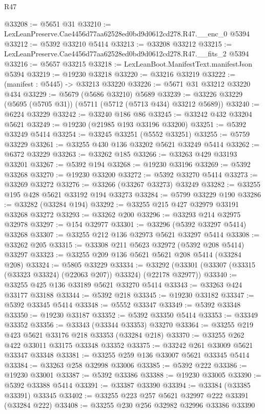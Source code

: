 \begin{lexlean}{R47}
\begin{coremodule}
@33208 := @5651 @31
@33210 := LexLeanPreserve.Cae4456d77aa62528ed0bd9d0612cd278.R47.__enc_0 @5394
@33212 := @5392 @33210 @5414
@33213 := @33208 @33212
@33215 := LexLeanPreserve.Cae4456d77aa62528ed0bd9d0612cd278.R47.__fits_2 @5394
@33216 := @5657 @33215
@33218 := LexLeanBoot.ManifestText.manifestJson @5394
@33219 := @19230 @33218
@33220 := @33216 @33219
@33222 := (manifest : @5445) -> @33213 @33220
@33226 := @5671 @31 @33212 @33220 @434
@33229 := @5679 (@5686 @33210) @5689
@33239 := @33226 @33229 (@5695 (@5705 @31)) (@5711 (@5712 (@5713 @434) @33212 @5689))
@33240 := @6224 @33229
@33242 := @33240 @186 @86
@33245 := @33242 @432 @33204 @5621
@33249 := @19230 (@21985 @193 @33196 @33200)
@33251 := @5392 @33249 @5414
@33254 := @33245 @33251 (@5552 @33251)
@33255 := @5759 @33229
@33261 := @33255 @430 @136 @33202 @5621 @33249 @5414
@33262 := @6372 @33229
@33263 := @33262 @185
@33266 := @33263 @429 @33193 @33201
@33267 := @5392 @194
@33268 := @19230 @33196
@33269 := @5392 @33268
@33270 := @19230 @33200
@33272 := @5392 @33270 @5414
@33273 := @33269 @33272
@33276 := @33266 (@33267 @33273) @33249
@33282 := @33255 @195 @428 @5621 @33192 @194 @33273
@33284 := @5799 @33229 @190
@33286 := @33282 (@33284 @194)
@33292 := @33255 @215 @427 @32979 @33191 @33268 @33272
@33293 := @33262 @200
@33296 := @33293 @214 @32975 @32978
@33297 := @154 @32977
@33301 := @33296 (@5392 @33297 @5414) @33268
@33307 := @33255 @212 @136 @32973 @5621 @33297 @5414
@33308 := @33262 @205
@33315 := @33308 @211 @5623 @32972 (@5392 @208 @5414) @33297
@33323 := @33255 @209 @136 @5621 @5621 @208 @5414 (@33284 @208)
@33324 := @5805 @33229
@33334 := @33292 (@33301 (@33307 (@33315 (@33323 @33324) (@22063 @207)) @33324) (@22178 @32977))
@33340 := @33255 @425 @136 @33189 @5621 @33270 @5414
@33343 := @33263 @424 @33177 @33188
@33344 := @5392 @218
@33345 := @19230 @33182
@33347 := @5392 @33345 @5414
@33348 := @5552 @33347
@33349 := @5392 @33348
@33350 := @19230 @33187
@33352 := @5392 @33350 @5414
@33353 := @33349 @33352
@33356 := @33343 (@33344 @33353) @33270
@33364 := @33255 @219 @423 @5621 @33176 @218 @33353 (@33284 @218)
@33370 := @33255 @262 @422 @33011 @33175 @33348 @33352
@33375 := @33242 @261 @33009 @5621 @33347 @33348
@33381 := @33255 @259 @136 @33007 @5621 @33345 @5414
@33384 := @33263 @258 @32998 @33006
@33385 := @5392 @222
@33386 := @19230 @33001
@33387 := @5392 @33386
@33388 := @19230 @33005
@33390 := @5392 @33388 @5414
@33391 := @33387 @33390
@33394 := @33384 (@33385 @33391) @33345
@33402 := @33255 @223 @257 @5621 @32997 @222 @33391 (@33284 @222)
@33408 := @33255 @230 @256 @32982 @32996 @33386 @33390

\end{coremodule}
\end{lexlean}
